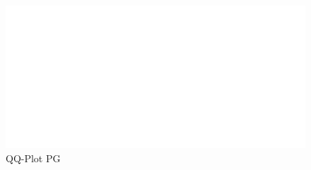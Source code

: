 \begin{figure}[h]
    \centering
    \begin{adjustbox}{width=.9\textwidth,center}
    \includegraphics[]{figures/PG_log_adjclose_fd_and_qq.pdf}
    \end{adjustbox}  
    \caption{QQ-Plot PG}
    \label{fig:PG_qq_fd_log_adjclose}
\end{figure}{}
